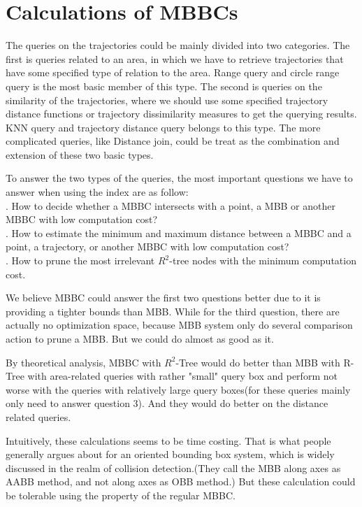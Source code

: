 \documentclass[sigplan]{acmart}
\begin{document}
\section{Calculations of MBBCs}
The queries on the trajectories could be mainly divided into two categories. The first is queries related to an area, in which we have to retrieve trajectories that have some specified type of relation to the area. Range query and circle range query is the most basic member of this type. The second is queries on the similarity of the trajectories, where we should use some specified trajectory distance functions or trajectory dissimilarity measures to get the querying results. KNN query and trajectory distance query belongs to this type. The more complicated queries, like Distance join, could be treat as the combination and extension of these two basic types.\par
To answer the two types of the queries, the most important questions we have to answer when using the index are as follow:\\
. How to decide whether a MBBC intersects with a point, a MBB or another MBBC with low computation cost?\\
. How to estimate the minimum and maximum distance between a MBBC and a point, a trajectory, or another MBBC with low computation cost?\\
. How to prune the most irrelevant $R^2$-tree nodes with the minimum computation cost.\par
We believe MBBC could answer the first two questions better due to it is providing a tighter bounds than MBB. While for the third question, there are actually no optimization space, because MBB system only do several comparison action to prune a MBB. But we could do almost as good as it.\par
By theoretical analysis, MBBC with $R^2$-Tree would do better than MBB with R-Tree with area-related queries with rather "small" query box and perform not worse with the queries with relatively large query boxes(for these queries mainly only need to answer question 3). And they would do better on the distance related queries.\par
Intuitively, these calculations seems to be time costing. That is what people generally argues about for an oriented bounding box system, which is widely discussed in the realm of collision detection.(They call the MBB along axes as AABB method, and not along axes as OBB method.) But these calculation could be tolerable using the property of the regular MBBC.\par
\end{document}
